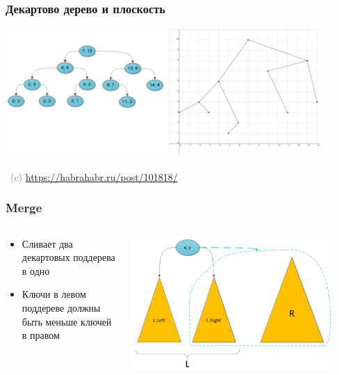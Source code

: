 \documentclass[xetex,mathserif,serif]{beamer}
\newcommand{\attribution}[1] {
	\vspace{-5mm}\begin{flushright}\begin{scriptsize}\textcolor{gray}{\textcopyright\, #1}\end{scriptsize}\end{flushright}
}
\begin{document}
	\begin{frame}
		\frametitle{Декартово дерево и плоскость}
		\begin{center}
			\includegraphics[width=0.9\textwidth]{treap-and-plain.png}
			\attribution{(c) \url{https://habrahabr.ru/post/101818/}}
		\end{center}
	\end{frame}

	\begin{frame}
		\frametitle{Merge}
		\begin{columns}
			\begin{column}{0.3\textwidth}
				\begin{itemize}
					\item Сливает два декартовых поддерева в одно
					\item Ключи в левом поддереве должны быть меньше ключей в правом
				\end{itemize}
			\end{column}
			\begin{column}{0.7\textwidth}
				\begin{center}
					\includegraphics[width=0.9\textwidth]{treap-merge.png}
				\end{center}
			\end{column}
		\end{columns}
	\end{frame}
\end{document}
